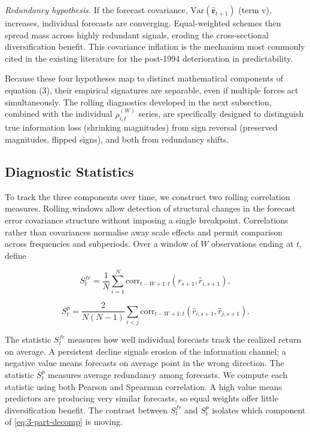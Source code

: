 \documentclass[a4paper,11pt]{article}
\begin{document}
\textit{Redundancy hypothesis.} If the forecast covariance, $\mathrm{Var}(\hat{\mathbf{r}}_{t+1})$ (term v), increases, individual forecasts are converging. Equal-weighted schemes then spread mass across highly redundant signals, eroding the cross-sectional diversification benefit. This covariance inflation is the mechanism most commonly cited in the existing literature for the post-1994 deterioration in predictability.

Because these four hypotheses map to distinct mathematical components of equation (3), their empirical signatures are separable, even if multiple forces act simultaneously. The rolling diagnostics developed in the next subsection, combined with the individual $\rho_{i,t}^{(W)}$ series, are specifically designed to distinguish true information loss (shrinking magnitudes) from sign reversal (preserved magnitudes, flipped signs), and both from redundancy shifts.

\subsection{Diagnostic Statistics}

To track the three components over time, we construct two rolling correlation measures. Rolling windows allow detection of structural changes in the forecast error covariance structure without imposing a single breakpoint. Correlations rather than covariances normalise away scale effects and permit comparison across frequencies and subperiods. Over a window of $W$ observations ending at $t$, define

\begin{equation}
S^{fr}_t = \frac{1}{N} \sum_{i=1}^{N} \mathrm{corr}_{{t-W+1}:t}(r_{s+1}, \hat{r}_{i,s+1}), \label{eq:7}
\end{equation}

\begin{equation}
S^{p}_t = \frac{2}{N(N-1)} \sum_{i < j} \mathrm{corr}_{t-W+1:t}(\hat{r}_{i,s+1}, \hat{r}_{j,s+1}). \label{eq:8}
\end{equation}

The statistic $S^{fr}_t$ measures how well individual forecasts track the realized return on average. A persistent decline signals erosion of the information channel; a negative value means forecasts on average point in the wrong direction. The statistic $S^{p}_t$ measures average redundancy among forecasts. We compute each statistic using both Pearson and Spearman correlation. A high value means predictors are producing very similar forecasts, so equal weights offer little diversification benefit. The contrast between $S^{fr}_t$ and $S^{p}_t$ isolates which component of \eqref{eq:3-part-decomp} is moving.
\end{document}
